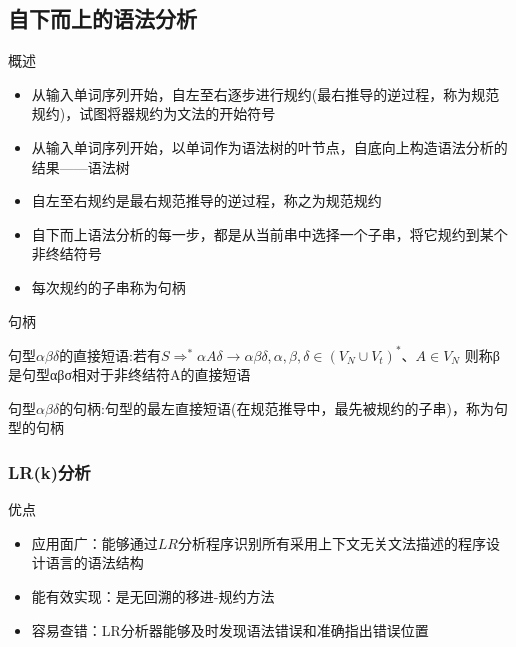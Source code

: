 \documentclass[utf8]{ctexart}
\begin{document}
\subsection{自下而上的语法分析}
\noindent 概述
\begin{itemize}
\item 从输入单词序列开始，自左至右逐步进行规约(最右推导的逆过程，称为规范规约)，试图将器规约为文法的开始符号
\item 从输入单词序列开始，以单词作为语法树的叶节点，自底向上构造语法分析的结果——语法树
\item 自左至右规约是最右规范推导的逆过程，称之为规范规约
\item 自下而上语法分析的每一步，都是从当前串中选择一个子串，将它规约到某个非终结符号
\item 每次规约的子串称为句柄
\end{itemize}

\noindent 句柄

句型$\alpha \beta \delta$的直接短语:若有$S \Rightarrow ^* \alpha A \delta \rightarrow \alpha \beta \delta, \alpha, \beta, \delta \in (V_N \cup V_t)^*、A \in V_N$
则称β是句型αβσ相对于非终结符A的直接短语

句型$\alpha \beta \delta$的句柄:句型的最左直接短语(在规范推导中，最先被规约的子串)，称为句型的句柄

\subsubsection{LR(k)分析}

\noindent 优点
\begin{itemize}
    \item 应用面广：能够通过$LR$分析程序识别所有采用上下文无关文法描述的程序设计语言的语法结构
    \item 能有效实现：是无回溯的移进-规约方法
    \item 容易查错：LR分析器能够及时发现语法错误和准确指出错误位置
\end{itemize}
\end{document}
